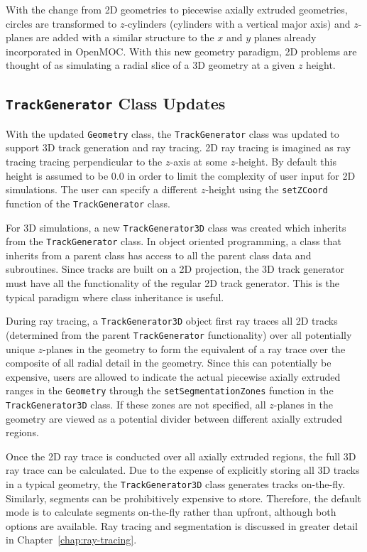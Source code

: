With the change from 2D geometries to piecewise axially extruded geometries, circles are transformed to $z$-cylinders (cylinders with a vertical major axis) and $z$-planes are added with a similar structure to the $x$ and $y$ planes already incorporated in OpenMOC. With this new geometry paradigm, 2D problems are thought of as simulating a radial slice of a 3D geometry at a given $z$ height. 

\subsection{\texttt{TrackGenerator} Class Updates}
\label{sec:oo-trackgenerator}

With the updated \texttt{Geometry} class, the \texttt{TrackGenerator} class was updated to support 3D track generation and ray tracing. 2D ray tracing is imagined as ray tracing tracing perpendicular to the $z$-axis at some $z$-height. By default this height is assumed to be 0.0 in order to limit the complexity of user input for 2D simulations. The user can specify a different $z$-height using the \texttt{setZCoord} function of the \texttt{TrackGenerator} class.

For 3D simulations, a new \texttt{TrackGenerator3D} class was created which inherits from the \texttt{TrackGenerator} class. In object oriented programming, a class that inherits from a parent class has access to all the parent class data and subroutines. Since tracks are built on a 2D projection, the 3D track generator must have all the functionality of the regular 2D track generator. This is the typical paradigm where class inheritance is useful. 

During ray tracing, a \texttt{TrackGenerator3D} object first ray traces all 2D tracks (determined from the parent \texttt{TrackGenerator} functionality) over all potentially unique $z$-planes in the geometry to form the equivalent of a ray trace over the composite of all radial detail in the geometry. Since this can potentially be expensive, users are allowed to indicate the actual piecewise axially extruded ranges in the \texttt{Geometry} through the \texttt{setSegmentationZones} function in the \texttt{TrackGenerator3D} class. If these zones are not specified, all $z$-planes in the geometry are viewed as a potential divider between different axially extruded regions.

Once the 2D ray trace is conducted over all axially extruded regions, the full 3D ray trace can be calculated. Due to the expense of explicitly storing all 3D tracks in a typical geometry, the \texttt{TrackGenerator3D} class generates tracks on-the-fly. Similarly, segments can be prohibitively expensive to store. Therefore, the default mode is to calculate segments on-the-fly rather than upfront, although both options are available. Ray tracing and segmentation is discussed in greater detail in Chapter~\ref{chap:ray-tracing}.

